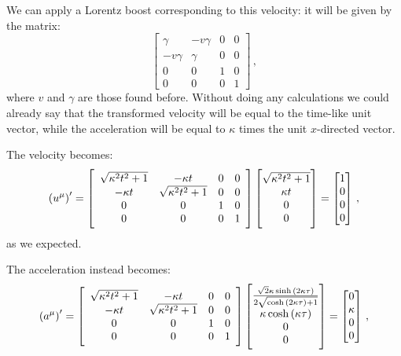 \documentclass[main.tex]{subfiles}
\begin{document}
We can apply a Lorentz boost corresponding to this velocity:
it will be given by the matrix:
%
\begin{equation}
  \left[\begin{array}{cccc}
  \gamma  & -v \gamma  & 0 & 0 \\ 
  -v \gamma  & \gamma  & 0 & 0 \\ 
  0 & 0 & 1 & 0 \\ 
  0 & 0 & 0 & 1
  \end{array}\right]
\,,
\end{equation}
%
where \(v\) and \(\gamma \) are those found before.
Without doing any calculations we could already say that the transformed velocity will be equal to the time-like unit vector, while the acceleration will be equal to \(\kappa \) times the unit \(x\)-directed vector.

The velocity becomes:
%
\begin{equation}
  \qty(u^{\mu})' =
  \left[\begin{array}{cccc}
    \sqrt{\kappa^2 t^2 + 1}  & -\kappa t  & 0 & 0 \\ 
    -\kappa t  & \sqrt{\kappa^2 t^2 + 1}  & 0 & 0 \\ 
    0 & 0 & 1 & 0 \\ 
    0 & 0 & 0 & 1
    \end{array}\right]
    \begin{bmatrix}
      \sqrt{\kappa^2 t^2 + 1}  \\
      \kappa t \\
      0 \\
      0
    \end{bmatrix} 
  = 
  \begin{bmatrix}
  1 \\
  0 \\
  0 \\
  0
  \end{bmatrix}
\,,
\end{equation}
%
as we expected.

The acceleration instead becomes:
%
\begin{equation}
  \qty(a^{\mu})' =
  \left[\begin{array}{cccc}
    \sqrt{\kappa^2 t^2 + 1}  & -\kappa t  & 0 & 0 \\ 
    -\kappa t  & \sqrt{\kappa^2 t^2 + 1}  & 0 & 0 \\ 
    0 & 0 & 1 & 0 \\ 
    0 & 0 & 0 & 1
    \end{array}\right]
    \begin{bmatrix}
      \frac{\sqrt{2} \kappa \sinh{\left(2 \kappa \tau \right)}}{2 \sqrt{\cosh{\left(2 \kappa \tau \right)} + 1}}
      \\
      \kappa \cosh \left(\kappa \tau \right)\\
      0 \\
      0
    \end{bmatrix}
  = 
  \begin{bmatrix}
  0 \\
  \kappa  \\
  0 \\
  0
  \end{bmatrix}
\,,
\end{equation}
%
\end{document}
